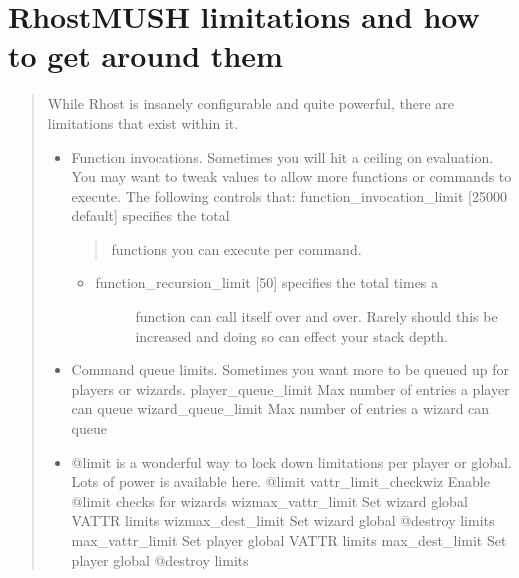 \documentclass[letterpaper,10pt,english]{sphinxmanual}
\begin{document}
\section{RhostMUSH limitations and how to get around them}
\label{\detokenize{12-advanced:rhostmush-limitations-and-how-to-get-around-them}}\begin{quote}

\sphinxAtStartPar
While Rhost is insanely configurable and quite powerful, there are
limitations that exist within it.
\begin{itemize}
\item {} 
\sphinxAtStartPar
Function invocations.  Sometimes you will hit a ceiling on evaluation.
You may want to tweak values to allow more functions or commands
to execute.  The following controls that:
\sphinxhyphen{} function\_invocation\_limit {[}25000 default{]} \sphinxhyphen{} specifies the total
\begin{quote}

\sphinxAtStartPar
functions you can execute per command.
\end{quote}
\begin{itemize}
\item {} \begin{description}
\item[{function\_recursion\_limit {[}50{]} \sphinxhyphen{} specifies the total times a}] \leavevmode
\sphinxAtStartPar
function can call itself over and over.  Rarely should this
be increased and doing so can effect your stack depth.

\end{description}

\end{itemize}

\item {} 
\sphinxAtStartPar
Command queue limits.  Sometimes you want more to be queued up for
players or wizards.
\sphinxhyphen{} player\_queue\_limit  \sphinxhyphen{} Max number of entries a player can queue
\sphinxhyphen{} wizard\_queue\_limit  \sphinxhyphen{} Max number of entries a wizard can queue

\item {} 
\sphinxAtStartPar
@limit is a wonderful way to lock down limitations per player or
global.  Lots of power is available here.
\sphinxhyphen{} @limit
\sphinxhyphen{} vattr\_limit\_checkwiz \sphinxhyphen{} Enable @limit checks for wizards
\sphinxhyphen{} wizmax\_vattr\_limit   \sphinxhyphen{} Set wizard global VATTR limits
\sphinxhyphen{} wizmax\_dest\_limit    \sphinxhyphen{} Set wizard global @destroy limits
\sphinxhyphen{} max\_vattr\_limit      \sphinxhyphen{} Set player global VATTR limits
\sphinxhyphen{} max\_dest\_limit       \sphinxhyphen{} Set player global @destroy limits


\end{itemize}
\end{quote}
\end{document}
